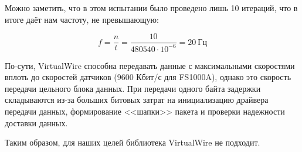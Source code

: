 Можно заметить, что в этом испытании было проведено лишь 10 итераций, что в итоге даёт нам частоту, не превышающую:

\begin{equation}
    \label{eq:freq3}
    f = \frac{n}{t} = \frac{10}{480540 \cdot 10^{-6}} = 20~\textrm{Гц}
\end{equation}

По-сути, VirtualWire способна передавать данные с максимальными скоростями вплоть до скоростей датчиков (9600 Кбит/с для FS1000A), однако это скорость передачи цельного блока данных. При передачи одного байта задержки складываются из-за больших битовых затрат на инициализацию драйвера передачи данных, формирование <<шапки>> пакета и проверки надежности доставки данных.

Таким образом, для наших целей библиотека VirtualWire не подходит.
